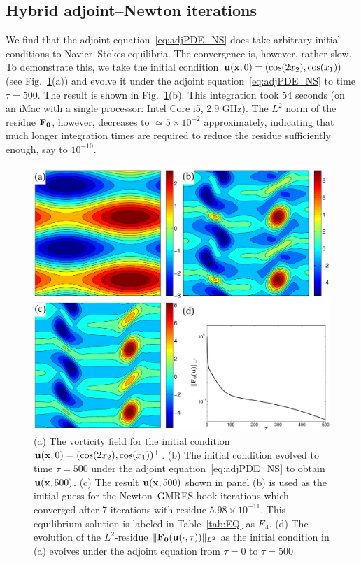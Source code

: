 \documentclass{article}
\begin{document}
\subsection{Hybrid adjoint--Newton iterations}\label{sec:hybrid}
We find that the adjoint equation~\eqref{eq:adjPDE_NS} does take arbitrary initial conditions to
Navier--Stokes equilibria. The convergence is, however, rather slow. To demonstrate this, we
take the initial condition $\mathbf u(\mathbf x,0)=(\cos(2x_2),\cos(x_1))$ (see Fig.~\ref{fig:hybrid}(a))
and
evolve it under the adjoint equation~\eqref{eq:adjPDE_NS} to time $\tau=500$. The result is
shown in Fig.~\ref{fig:hybrid}(b). This integration took $54$ seconds
(on an iMac with a single processor: Intel Core i5, 2.9 GHz).
The $L^2$ norm of the residue $\mathbf F_{\mathbf 0}$, however,
decreases to $\simeq 5\times 10^{-2}$ approximately, indicating that much longer integration times
are required to reduce the residue sufficiently enough, say to $10^{-10}$.
%
\begin{figure}
\centering
\includegraphics[width=.85\textwidth]{hybrid}
\caption{
(a) The vorticity field for the initial condition $\mathbf
u(\mathbf x,0)=(\cos(2x_2),\cos(x_1))^\top$.
(b) The initial
condition evolved to time $\tau=500$ under the adjoint equation~\eqref{eq:adjPDE_NS} to obtain
$\mathbf u(\mathbf x,500)$.
(c) The result $\mathbf u(\mathbf x,500)$ shown in panel (b) is used as the initial
guess for the
Newton--GMRES-hook iterations which converged after $7$ iterations with residue
$5.98\times 10^{-11}$. This equilibrium solution is labeled in Table~\ref{tab:EQ} as $E_4$.
(d) The evolution of the $L^2$-residue $\|\mathbf F_{\mathbf 0}(\mathbf u(\cdot,\tau))\|_{L^2}$
as the initial condition in (a) evolves under the adjoint equation from
$\tau=0$ to $\tau=500$}
\label{fig:hybrid}
\end{figure}
\end{document}
